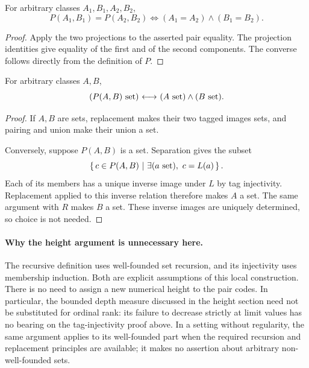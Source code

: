 \begin{theorem}
For arbitrary classes $A_1,B_1,A_2,B_2$,
\[
P(A_1,B_1)=P(A_2,B_2)
\iff (A_1=A_2)\land(B_1=B_2).
\label{thm:recursive_pair_uniqueness}
\]
\end{theorem}
\begin{proof}
Apply the two projections to the asserted pair equality. The projection
identities give equality of the first and of the second components.
The converse follows directly from the definition of $P$.
\end{proof}

\begin{theorem}
For arbitrary classes $A,B$,
\[
(P(A,B)\mathrm{\ set}){\ \longleftrightarrow\ } (A\mathrm{\ set})\land(B\mathrm{\ set}).
\label{thm:recursive_pair_sethood}
\]
\end{theorem}
\begin{proof}
If $A,B$ are sets, replacement makes their two tagged images sets, and
pairing and union make their union a set.

Conversely, suppose $P(A,B)$ is a set. Separation gives the subset
\[
\cc{c\in P(A,B)}{\exists(a\set),\ c=L(a)}.
\]
Each of its members has a unique inverse image under $L$ by tag
injectivity. Replacement applied to this inverse relation therefore makes
$A$ a set. The same argument with $R$ makes $B$ a set. These inverse
images are uniquely determined, so choice is not needed.
\end{proof}

\paragraph{Why the height argument is unnecessary here.}
The recursive definition uses well-founded set recursion, and its injectivity
uses membership induction. Both are explicit assumptions of this local
construction. There is no need to assign a new numerical height to the pair
codes. In particular, the bounded depth measure discussed in the height
section need not be substituted for ordinal rank: its failure to decrease
strictly at limit values has no bearing on the tag-injectivity proof above.
In a setting without regularity, the same argument applies to its
well-founded part when the required recursion and replacement principles
are available; it makes no assertion about arbitrary non-well-founded sets.

